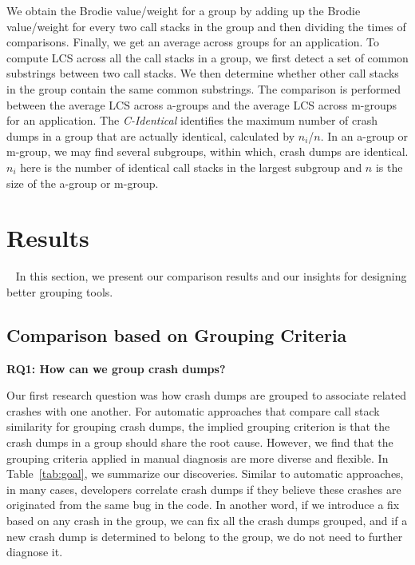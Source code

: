\documentclass{llncs}
\newcommand{\todo}[1]{\textcolor{cyan}{\textbf{[#1]}}}
\begin{document}

We obtain the Brodie value/weight for a group by adding up the Brodie value/weight for every two call stacks in the group and then dividing the times of comparisons. Finally, we get an average across groups for an application. To compute LCS across all the call stacks in a group, we first detect a set of common substrings between two call stacks. We then determine whether other call stacks in the group contain the same common substrings. The comparison is performed between the average LCS across a-groups and the average LCS across m-groups for an application. The {\it C-Identical} identifies the maximum number of crash dumps in a group that are actually identical, calculated by $n_i$/$n$. In an a-group or m-group, we may find several subgroups, within which, crash dumps are identical. $n_i$ here is the number of identical call stacks in the largest subgroup and $n$ is the size of the a-group or m-group.

\section{Results}~\label{sec:results}
In this section, we present our comparison results and our insights for designing better grouping tools.

\subsection{Comparison based on Grouping Criteria}



\textbf{RQ1: How can we group crash dumps?}







Our first research question was how crash dumps are grouped to associate related crashes with one another. For automatic approaches that compare call stack similarity for grouping crash dumps, the implied grouping criterion is that the crash dumps in a group should share the root cause. However, we find that the grouping criteria applied in manual diagnosis are more diverse and flexible. In Table~\ref{tab:goal}, we summarize our discoveries. Similar to automatic approaches, in many cases, developers correlate crash dumps if they believe these crashes are originated from the same bug in the code. In another word, if we introduce a fix based on any crash in the group, we can fix all the crash dumps grouped, and if a new crash dump is determined to belong to the group, we do not need to further diagnose it.
\end{document}
